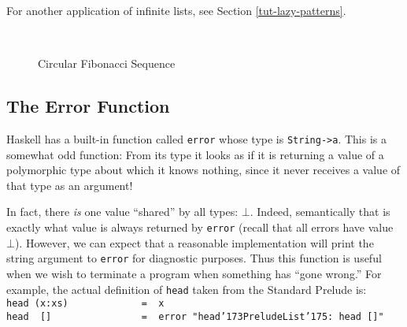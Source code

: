 For another application of infinite lists, see Section \ref{tut-lazy-patterns}.

\begin{figure}
\begin{center}
\mbox{
{\epsfxsize=2.5in }}
\end{center}
\caption{Circular Fibonacci Sequence}
\label{tut-fib-fig}
\end{figure}

\subsection{The Error Function}

Haskell has a built-in function called \mbox{\tt error} whose type is
\mbox{\tt String->a}.  This is a somewhat odd function: From its type it looks
as if it is returning a value of a polymorphic type about which it
knows nothing, since it never receives a value of that type as an
argument!

In fact, there {\em is} one value ``shared'' by all types: $\bot$.
Indeed, semantically that is exactly what value is always returned by
\mbox{\tt error} (recall that all errors have value $\bot$).  However, we can
expect that a reasonable implementation will print the string argument
to \mbox{\tt error} for diagnostic purposes.  Thus this function is useful when
we wish to terminate a program when something has ``gone wrong.''  For
example, the actual definition of \mbox{\tt head} taken from the Standard
Prelude is:
\bprog
\mbox{\tt head\ (x:xs)\ \ \ \ \ \ \ \ \ \ \ \ \ =\ \ x}\\
\mbox{\tt head\ \ []\ \ \ \ \ \ \ \ \ \ \ \ \ \ \ \ =\ \ error\ "head{\char'173}PreludeList{\char'175}:\ head\ []"}
\eprog 

 
